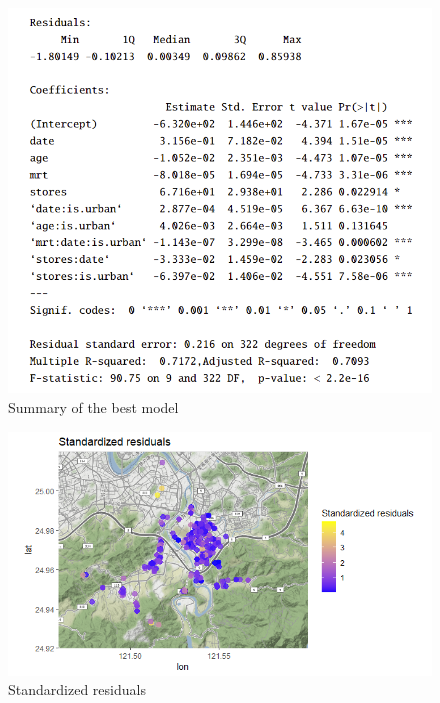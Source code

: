 \begin{figure}[hbt!]
    \centering
    \includegraphics[scale=0.7]{img/summary.png}
    \caption{Summary of the best model}
    \label{fig:summary}
\end{figure}

\begin{figure}[hbt!]
    \centering
    \includegraphics[scale=0.80]{img/standres.png}
    \caption{Standardized residuals}
    \label{fig:standres}
\end{figure}

